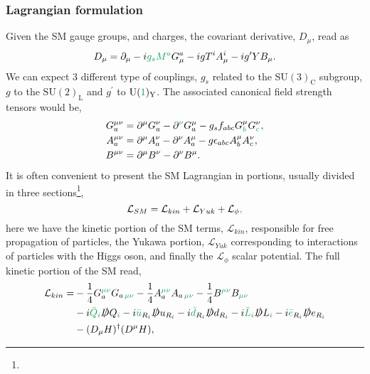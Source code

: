 \subsubsection{Lagrangian formulation }
%
Given the SM gauge groups,  and charges,  the covariant derivative, $D_\mu$,  read as
%
\begin{equation}
\label{eq:PartialDefSM}
D_\mu = \partial_\mu - i \Joaoadd{g_s} \Joaoadd{M^a} G^a_\mu - i g T^i A^i_\mu - i g' Y B_\mu.
\end{equation}  
%
 We can expect 3 different type of couplings, $g_s$ related to the $\mathrm{SU(3)_C}$ subgroup, $g$ to the $\mathrm{SU(2)_L}$ and $g^\prime$ to $\mathrm{U(\Joaoadd{1})_Y}$. The associated canonical field strength tensors would be,
\begin{equation}\label{eq:Field_strength_tensors}
\begin{aligned}
G_a^{\mu \nu} & = \partial^\mu G^\nu_a - \partial^{\Joaoadd{\nu}} G^\mu_a - g_s f_{abc} G_{\Joaoadd{b}}^\mu G_{\Joaoadd{c}}^\nu,  \\ 
A_a^{\mu \nu} & = \partial^\mu A^\nu_a - \partial^\nu A^\mu_a  - g \epsilon_{abc} A^\mu_b A^\nu_c, \\
B^{\mu \nu}   & = \partial^\mu B^\nu - \partial^\nu B^\mu.
\end{aligned}
\end{equation}
It is often convenient to present the SM Lagrangian in portions, usually divided in three sections\footnote{},
\begin{equation}\label{eq:SM_baby_lagrangian}
\mathcal{L}_{SM} = \mathcal{L}_{kin}  +  \mathcal{L}_{Yuk} +  \mathcal{L}_{\phi}\Joaoadd{,}
\end{equation}
here we have the kinetic portion of the SM terms, $\mathcal{L}_{kin}$, responsible for  free propagation of particles, the Yukawa portion, $\mathcal{L}_{Yuk}$  corresponding to interactions of particles with the Higgs oson, and finally the $\mathcal{L}_{\phi}$ scalar potential. The full kinetic portion of the SM read, 
%
\begin{equation}\label{eq:KinSM}
\begin{aligned}
\mathcal{L}_{kin} = & - \frac{1}{4} G^{\Joaoadd{\mu\nu}}_a G_{a \,\Joaoadd{\mu\nu}}  - \frac{1}{4}  A^{\Joaoadd{\mu\nu}}_a A_{a \,\Joaoadd{\mu\nu}}  
- \frac{1}{4}  B^{\Joaoadd{\mu\nu}} B_{\Joaoadd{\mu\nu}}  \\ 
 & -i \Joaoadd{\bar{Q}}_{\Joaoadd{i}} \slashed{D} Q_{\Joaoadd{i}} 
   -i \Joaoadd{\bar{u}}_{R_i} \slashed{D} u_{R_i}  
   -i \Joaoadd{\bar{d}}_{R_i} \slashed{D} d_{R_i}  
   -i \Joaoadd{\bar{L}}_{\Joaoadd{i}} \slashed{D} L_{\Joaoadd{i}}    
   -i \Joaoadd{\bar{e}}_{R_i} \slashed{D} e_{R_i}   \\
 & - (D_\mu H)^\dagger ( D^\mu H ),    
\end{aligned}
\end{equation}
